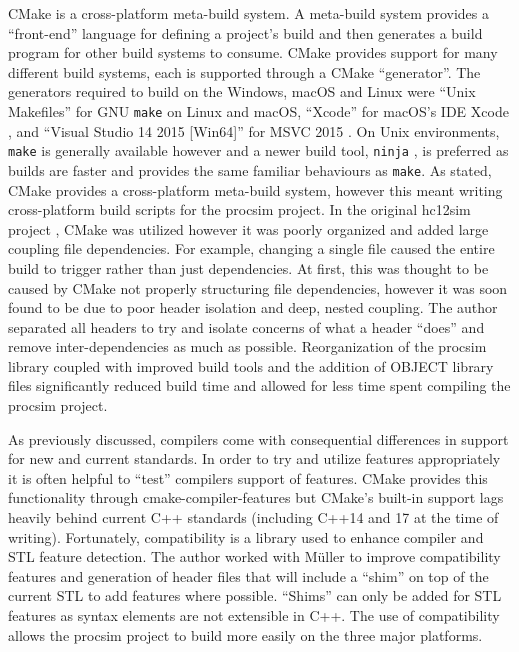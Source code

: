 CMake \cite{Kitware:CMake} is a cross-platform meta-build system. A meta-build system provides a ``front-end'' language for defining a project's build and then generates a build program for other build systems to consume. CMake provides support for many different build systems, each is supported through a CMake ``generator''. The generators required to build on the Windows, macOS and Linux were ``Unix Makefiles'' for GNU \verb|make| \cite{GNU:Make} on Linux and macOS, ``Xcode'' for macOS's IDE Xcode \cite{Apple:Xcode}, and ``Visual Studio 14 2015 [Win64]'' for MSVC 2015 \cite{CMake:Generators}. On Unix environments, \verb|make| is generally available however and a newer build tool, \verb|ninja| \cite{NinjaBuild}, is preferred as builds are faster and provides the same familiar behaviours as \verb|make|. As stated, CMake provides a cross-platform meta-build system, however this meant writing cross-platform build scripts for the procsim project. In the original hc12sim project \cite{Brightwell2013}, CMake was utilized however it was poorly organized and added large coupling file dependencies. For example, changing a single file caused the entire build to trigger rather than just dependencies. At first, this was thought to be caused by CMake not properly structuring file dependencies, however it was soon found to be due to poor header isolation and deep, nested coupling. The author separated all headers to try and isolate concerns of what a header ``does'' and remove inter-dependencies as much as possible. Reorganization of the procsim library coupled with improved build tools and the addition of OBJECT library files \cite{CMake:add_library:ObjectLibraries} significantly reduced build time and allowed for less time spent compiling the procsim project. 

As previously discussed, compilers come with consequential differences in support for new and current standards. In order to try and utilize features appropriately it is often helpful to ``test'' compilers support of features. CMake provides this functionality through cmake-compiler-features \cite{CMake:compile-features} but CMake's built-in support lags heavily behind current C++ standards (including C++14 and 17 at the time of writing). Fortunately, compatibility \cite{CMakeCompatibility} is a library used to enhance compiler and STL feature detection. The author worked with M\"uller to improve compatibility features and generation of header files that will include a ``shim'' on top of the current STL to add features where possible. ``Shims'' can only be added for STL features as syntax elements are not extensible in C++. The use of compatibility allows the procsim project to build more easily on the three major platforms. 


